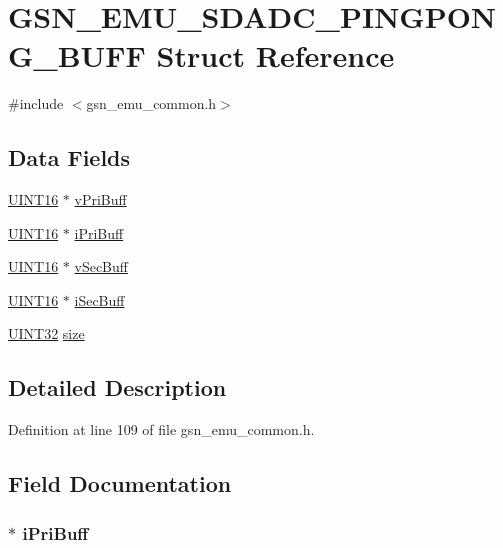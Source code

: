 \hypertarget{a00067}{
\section{GSN\_\-EMU\_\-SDADC\_\-PINGPONG\_\-BUFF Struct Reference}
\label{a00067}
}


{\ttfamily \#include $<$gsn\_\-emu\_\-common.h$>$}

\subsection*{Data Fields}
\begin{DoxyCompactItemize}
\item 
\hyperlink{a00660_ga09f1a1fb2293e33483cc8d44aefb1eb1}{UINT16} $\ast$ \hyperlink{a00067_a77083f65d07fe8f75e584d5e26c340f2}{vPriBuff}
\item 
\hyperlink{a00660_ga09f1a1fb2293e33483cc8d44aefb1eb1}{UINT16} $\ast$ \hyperlink{a00067_a78771aa992a963948c5b54aecebaef2f}{iPriBuff}
\item 
\hyperlink{a00660_ga09f1a1fb2293e33483cc8d44aefb1eb1}{UINT16} $\ast$ \hyperlink{a00067_a53f160eb100d781fd2db189568a7dc13}{vSecBuff}
\item 
\hyperlink{a00660_ga09f1a1fb2293e33483cc8d44aefb1eb1}{UINT16} $\ast$ \hyperlink{a00067_a144da2d3a7476e0fd4942873b565c233}{iSecBuff}
\item 
\hyperlink{a00660_gae1e6edbbc26d6fbc71a90190d0266018}{UINT32} \hyperlink{a00067_a6d4bac4be8d2f0ee400eb63ac2204aac}{size}
\end{DoxyCompactItemize}


\subsection{Detailed Description}


Definition at line 109 of file gsn\_\-emu\_\-common.h.



\subsection{Field Documentation}
\hypertarget{a00067_a78771aa992a963948c5b54aecebaef2f}{
\subsubsection[{iPriBuff}]{$\ast$ {\bf iPriBuff}}}
\label{a00067_a78771aa992a963948c5b54aecebaef2f}


